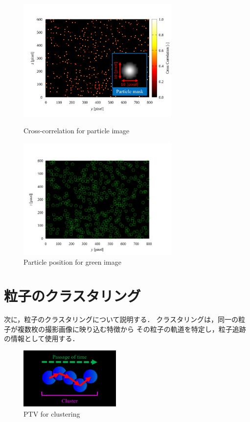 \documentclass[twocolumn,a4j]{jsarticle}
\begin{document}
\newpage
\begin{figure}[htbp]
	\centering
	\includegraphics[keepaspectratio, width=80mm]{../images/closs-correlation_for_particle.png}
	\caption{Cross-correlation for particle image}
	\includegraphics[keepaspectratio, width=80mm]{../images/particle_position.png}
	\caption{Particle position for green image}
\end{figure}

\section{粒子のクラスタリング}
次に，粒子のクラスタリングについて説明する．
クラスタリングは，同一の粒子が複数枚の撮影画像に映り込む特徴から
その粒子の軌道を特定し，粒子追跡の情報として使用する．

\begin{figure}[htbp]
	\centering
	\includegraphics[keepaspectratio, width=50mm]{../images/how_to_get_cluster.png}
	\caption{PTV for clustering}
\end{figure}
\end{document}
